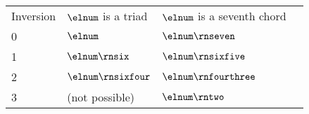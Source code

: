 \begin{tabular}{l|lll}
Inversion & $\elnum$ is a triad & $\elnum$ is a seventh chord \\
0 & $\elnum$ & $\elnum\rnseven$ \\
1 & $\elnum\rnsix$ & $\elnum\rnsixfive$ \\
2 & $\elnum\rnsixfour$ & $\elnum\rnfourthree$ \\
3 & (not possible) & $\elnum\rntwo$ \\
\end{tabular}
